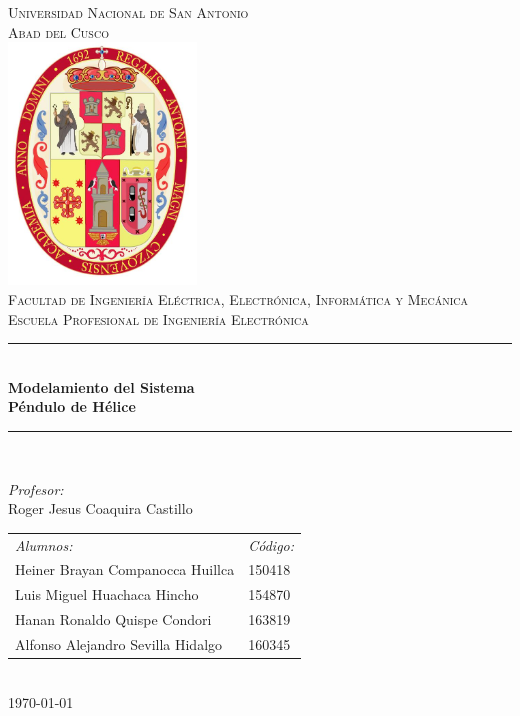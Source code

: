 \documentclass[12pt]{article}
\date{\today}
\begin{document}
\begin{titlepage}
\newcommand{\HRule}{\rule{\linewidth}{0.5mm}} 
\center
\textsc{\LARGE Universidad Nacional de San Antonio \\[0.2cm] Abad del Cusco}\\[1.5cm] 
\includegraphics[width=5cm]{escudo.jpg}\\[1cm]
\textsc{\Large Facultad de Ingeniería Eléctrica, Electrónica, Informática y Mecánica}\\[0.5cm] 
\textsc{\large Escuela Profesional de Ingeniería Electrónica}\\[0.5cm]
\HRule \\[0.4cm]
{ \huge \bfseries Modelamiento del Sistema\\\vspace{2mm}
Péndulo de Hélice}\\[0.4cm] 
\HRule \\[1.5cm]
\begin{minipage}{\textwidth}
\center 

\emph{Profesor:} \\
Roger Jesus Coaquira Castillo \\[1cm]

\begin{tabular}{ll}
\emph{Alumnos:} & \emph{Código:}\\
Heiner Brayan Companocca Huillca & 150418 \\
Luis Miguel Huachaca Hincho & 154870 \\
Hanan Ronaldo Quispe Condori & 163819 \\
Alfonso Alejandro Sevilla Hidalgo & 160345 \\
\end{tabular}
\end{minipage}\\[2cm]
\today
\end{titlepage}


\tableofcontents
\end{document}
